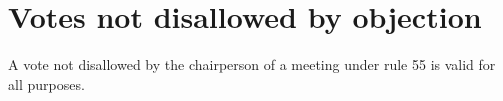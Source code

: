 \section{Votes not disallowed by objection}

A vote not disallowed by the chairperson of a meeting under rule 55 is valid for all purposes. 